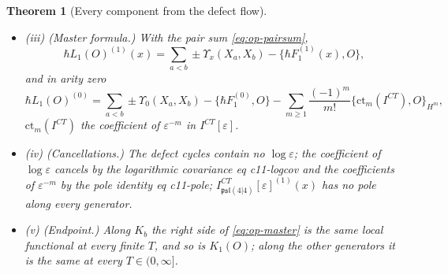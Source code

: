 \documentclass[11pt]{article}
\numberwithin{equation}{section}
\theoremstyle{plain}
\newtheorem{theorem}{Theorem}[section]
\theoremstyle{definition}
\newcommand{\psl}{\mathfrak{psl}(4|4)}
\newcommand{\ct}{\mathrm{ct}}
\begin{document}
\begin{theorem}[Every component from the defect flow]
\begin{itemize}
\item (iii) (Master formula.) With the pair sum \eqref{eq:op-pairsum},
\begin{equation}
\hbar L_1(O)^{(1)}(x)=\sum_{a<b}\pm\Upsilon_x(X_a,X_b)-\big\{\hbar F_1^{(1)}(x),O\big\},
\label{eq:op-master}
\end{equation}
and in arity zero
\begin{equation}
\hbar L_1(O)^{(0)}=\sum_{a<b}\pm\Upsilon_0(X_a,X_b)-\big\{\hbar F_1^{(0)},O\big\}-\sum_{m\ge1}\frac{(-1)^m}{m!}\big\{\ct_m(I^{CT}),O\big\}_{H^m},
\label{eq:op-master0}
\end{equation}
$\ct_m(I^{CT})$ the coefficient of $\varepsilon^{-m}$ in $I^{CT}[\varepsilon]$.
\item (iv) (Cancellations.) The defect cycles contain no $\log\varepsilon$; the coefficient of $\log\varepsilon$ cancels by the logarithmic covariance eq c11-logcov and the coefficients of $\varepsilon^{-m}$ by the pole identity eq c11-pole; $I^{CT}_{\psl}[\varepsilon]^{(1)}(x)$ has no pole along every generator.
\item (v) (Endpoint.) Along $K_b$ the right side of \eqref{eq:op-master} is the same local functional at every finite $T$, and so is $K_1(O)$; along the other generators it is the same at every $T\in(0,\infty]$.
\end{itemize}
\end{theorem}
\end{document}
